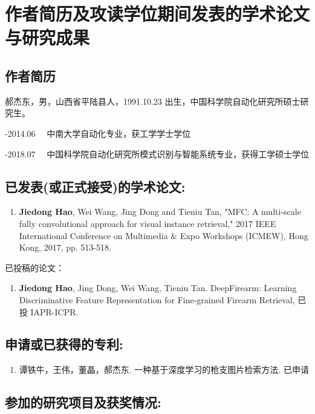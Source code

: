 
\chapter{作者简历及攻读学位期间发表的学术论文与研究成果}

\section*{作者简历}

\noindent
郝杰东，男，山西省平陆县人，1991.10.23 出生，中国科学院自动化研究所硕士研究生。

-2014.06 \ \ 中南大学自动化专业，获工学学士学位

-2018.07 \ \ 中国科学院自动化研究所模式识别与智能系统专业，获得工学硕士学位

\section*{已发表(或正式接受)的学术论文:}

\begin{enumerate}

	\item \textbf{Jiedong Hao}, Wei Wang, Jing Dong and Tieniu Tan, "MFC: A multi-scale fully convolutional approach for visual instance retrieval," 2017 IEEE International Conference on Multimedia \& Expo Workshops (ICMEW), Hong Kong, 2017, pp. 513-518.
\end{enumerate}

\noindent 已投稿的论文：

\begin{enumerate}
	\item \textbf{Jiedong Hao}, Jing Dong, Wei Wang, Tieniu Tan. DeepFirearm: Learning Discriminative Feature
Representation for Fine-grained Firearm Retrieval, 已投 IAPR-ICPR.
\end{enumerate}

\section*{申请或已获得的专利:}

\begin{enumerate}
	\item 谭铁牛，王伟，董晶，郝杰东. 一种基于深度学习的枪支图片检索方法. 已申请
\end{enumerate}

\section*{参加的研究项目及获奖情况:}

